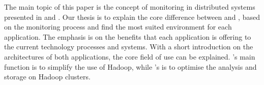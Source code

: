 
The main topic of this paper is the concept of monitoring in distributed systems presented in \ambshort and \chukshort. 
Our thesis is to explain the core difference between \ambshort and \chukshort, based on the monitoring process and find the most suited environment for each application. 
The emphasis is on the benefits that each application is offering to the current technology processes and systems. 
With a short introduction on the architectures of both applications, the core field of use can be explained. 
\ambshort's main function is to simplify the use of Hadoop, while \chukshort's is to optimise the analysis and storage on Hadoop clusters. 